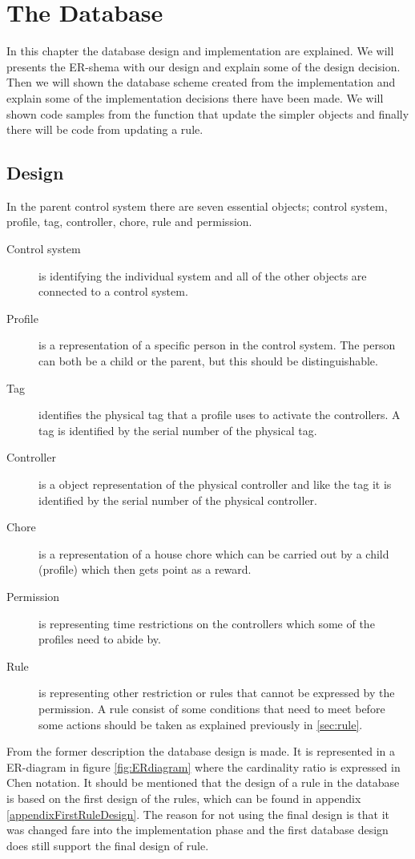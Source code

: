 \chapter{The Database}
\label{chap:database} 
In this chapter the database design and implementation are explained. We will presents the ER-shema with our design and explain some of the design decision. Then we will shown the database scheme created from the implementation and explain some of the implementation decisions there have been made. We will shown code samples from the function that update the simpler objects and finally there will be code from updating a rule.  
  
\section{Design}
\label{sec:DBdesign}
In the parent control system there are seven essential objects; control system, profile, tag, controller, chore, rule and permission. 

\begin{description}
	\item[Control system] is identifying the individual system and all of the other objects are connected to a control system.
	\item[Profile] is a representation of a specific person in the control system. The person can both be a child or the parent, but this should be distinguishable.
	\item[Tag] identifies the physical tag that a profile uses to activate the controllers. A tag is identified by the serial number of the physical tag.
	\item[Controller]	is a object representation of the physical controller and like the tag it is identified by the serial number of the physical controller.
	\item[Chore] is a representation of a house chore which can be carried out by a child (profile) which then gets point as a reward.
	\item[Permission] is representing time restrictions on the controllers which some of the profiles need to abide by. 
	\item[Rule] is representing other restriction or rules that cannot be expressed by the permission. A rule consist of some conditions that need to meet before some actions should be taken as explained previously in \vref{sec:rule}. 
\end{description}

From the former description the database design is made. It is represented in a ER-diagram in figure \ref{fig:ERdiagram} where the cardinality ratio is expressed in Chen notation\citep{DatabaseKilde}. It should be mentioned that the design of a rule in the database is based on the first design of the rules, which can be found in appendix \vref{appendixFirstRuleDesign}. The reason for not using the final design is that it was changed fare into the implementation phase and the first database design does still support the final design of rule. 

